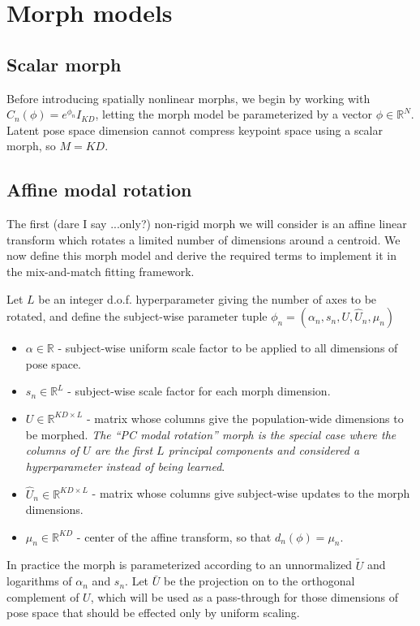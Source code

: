 \documentclass{article}         %
\newcommand{\RR}{\mathbb{R}}
\begin{document}
\section{Morph models}

\subsection{Scalar morph}

Before introducing spatially nonlinear morphs, we begin by working with $C_n(\phi) = e^{\phi_n} I_{KD}$, letting the morph model be parameterized by a vector $\phi \in \RR^N$. Latent pose space dimension cannot compress keypoint space using a scalar morph, so $M = KD$.

\subsection{Affine modal rotation}

The first (dare I say ...only?) non-rigid morph we will consider is an affine linear transform which rotates a limited number of dimensions around a centroid. We now define this morph model and derive the required terms to implement it in the mix-and-match fitting framework.

Let $L$ be an integer d.o.f. hyperparameter giving the number of axes to be rotated, and define the subject-wise parameter tuple $\phi_n = (\alpha_n, s_n, U, \hat{U}_n, \mu_n)$
\begin{itemize}
    \item $\alpha\in\RR$ - subject-wise uniform scale factor to be applied to all dimensions of pose space.
    \item $s_n \in \RR^L$ - subject-wise scale factor for each morph dimension.
    \item $U\in \RR^{KD\times L}$ - matrix whose columns give the population-wide dimensions to be morphed. \textit{The ``PC modal rotation'' morph is the special case where the columns of $U$ are the first $L$ principal components and considered a hyperparameter instead of being learned}.
    \item $\hat{U}_n\in\RR^{KD \times L}$ - matrix whose columns give subject-wise updates to the morph dimensions.
    \item $\mu_n\in \RR^{KD}$ - center of the affine transform, so that $d_n(\phi) = \mu_n$. 
\end{itemize}

In practice the morph is parameterized according to an unnormalized $\tilde{U}$ and logarithms of $\alpha_n$ and $s_n$. Let $\bar{U}$ be the projection on to the orthogonal complement of $U$, which will be used as a pass-through for those dimensions of pose space that should be effected only by uniform scaling.
\end{document}
